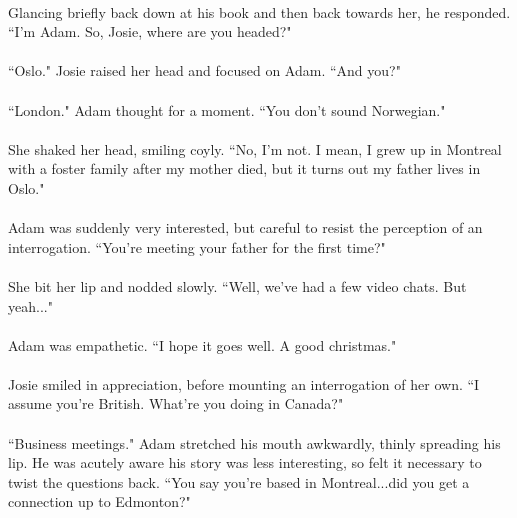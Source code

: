 \documentclass{article}
\begin{document}
\paragraph{}
Glancing briefly back down at his book and then back towards her, he responded. ``I'm Adam. So, Josie, where are you headed?"

\paragraph{}
``Oslo." Josie raised her head and focused on Adam. ``And you?"

\paragraph{}
``London." Adam thought for a moment. ``You don't sound Norwegian."

\paragraph{}
She shaked her head, smiling coyly. ``No, I'm not. I mean, I grew up in Montreal with a foster family after my mother died, but it turns out my father lives in Oslo."

\paragraph{}
Adam was suddenly very interested, but careful to resist the perception of an interrogation. ``You're meeting your father for the first time?"

\paragraph{}
She bit her lip and nodded slowly. ``Well, we've had a few video chats. But yeah..."

\paragraph{}
Adam was empathetic. ``I hope it goes well. A good christmas."

\paragraph{}
Josie smiled in appreciation, before mounting an interrogation of her own. ``I assume you're British. What're you doing in Canada?"

\paragraph{}
``Business meetings." Adam stretched his mouth awkwardly, thinly spreading his lip. He was acutely aware his story was less interesting, so felt it necessary to twist the questions back. ``You say you're based in Montreal...did you get a connection up to Edmonton?"
\end{document}
